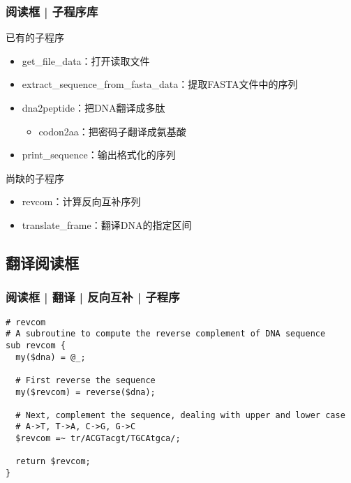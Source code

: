 \begin{frame}
  \frametitle{阅读框 | 子程序库}
  \begin{block}{已有的子程序}
    \begin{itemize}
      \item get\_file\_data：打开读取文件
      \item extract\_sequence\_from\_fasta\_data：提取FASTA文件中的序列
      \item dna2peptide：把DNA翻译成多肽
	\begin{itemize}
	  \item codon2aa：把密码子翻译成氨基酸
	\end{itemize}
      \item print\_sequence：输出格式化的序列
    \end{itemize}
  \end{block}
  \pause
  \begin{block}{尚缺的子程序}
    \begin{itemize}
      \item revcom：计算反向互补序列
      \item translate\_frame：翻译DNA的指定区间
    \end{itemize}
  \end{block}
\end{frame}

\subsection{翻译阅读框}
\begin{frame}[fragile]
  \frametitle{阅读框 | 翻译 | 反向互补 | 子程序}
  \vspace{-0.8em}
\begin{lstlisting}
# revcom 
# A subroutine to compute the reverse complement of DNA sequence
sub revcom {
  my($dna) = @_;

  # First reverse the sequence
  my($revcom) = reverse($dna);

  # Next, complement the sequence, dealing with upper and lower case
  # A->T, T->A, C->G, G->C
  $revcom =~ tr/ACGTacgt/TGCAtgca/;

  return $revcom;
}
\end{lstlisting}
\end{frame}

